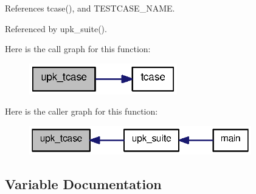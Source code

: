 References tcase(), and TESTCASE\_\-NAME.



Referenced by upk\_\-suite().



Here is the call graph for this function:\nopagebreak
\begin{figure}[H]
\begin{center}
\leavevmode
\includegraphics[width=182pt]{tests_2uuid_8c_af6888f755408e718291d8b54195c48be_cgraph}
\end{center}
\end{figure}




Here is the caller graph for this function:\nopagebreak
\begin{figure}[H]
\begin{center}
\leavevmode
\includegraphics[width=274pt]{tests_2uuid_8c_af6888f755408e718291d8b54195c48be_icgraph}
\end{center}
\end{figure}




\subsection{Variable Documentation}
\subsubsection[{END\_\-TEST}]{}\label{tests_2uuid_8c_a458b78ce9e48beb128edb722b07e4716}
